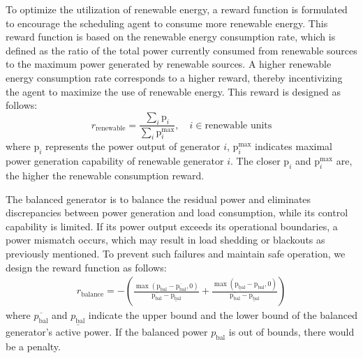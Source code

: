 To optimize the utilization of renewable energy, a reward function is formulated to encourage the scheduling agent to consume more renewable energy. This reward function is based on the renewable energy consumption rate, which is defined as the ratio of the total power currently consumed from renewable sources to the maximum power generated by renewable sources. A higher renewable energy consumption rate corresponds to a higher reward, thereby incentivizing the agent to maximize the use of renewable energy. This reward is designed as follows:
\begin{equation}
    r_{\text{renewable}}=\frac{\sum_i\text{p}_i}{\sum_i\text{p}_i^{\text{max}}},\quad i\in\text{renewable units}
\end{equation}
where $\text{p}_i$ represents the power output of generator $i$, $\text{p}_i^\text{max}$ indicates maximal power generation capability of renewable generator $i$. The closer $\text{p}_i$ and $\text{p}_i^\text{max}$ are, the higher the renewable consumption reward.

 The balanced generator is to balance the residual power and eliminates discrepancies between power generation and load consumption, while its control capability is limited. If its power output exceeds its operational boundaries, a power mismatch occurs, which may result in load shedding or blackouts as previously mentioned. To prevent such failures and maintain safe operation, we design the reward function as follows:
\begin{gather}
    r_\text{balance} = -\left(\frac{\max(\text{p}_\text{bal}-\overline{\text{p}_\text{bal}},0)}{\overline{\text{p}_\text{bal}}-\underline{\text{p}_\text{bal}}}+\frac{\max(\underline{\text{p}_\text{bal}}-\text{p}_\text{bal},0)}{\overline{\text{p}_\text{bal}}-\underline{\text{p}_\text{bal}}}\right)
\end{gather}
where $\overline{p_\text{bal}}$ and $\underline{p_\text{bal}}$ indicate the upper bound and the lower bound of the balanced generator's active power. If the balanced power $p_\text{bal}$ is out of bounds, there would be a penalty.


